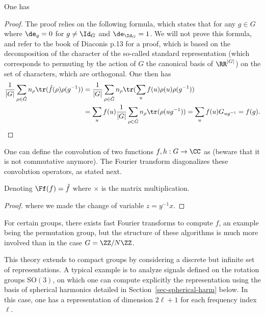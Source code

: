 \begin{prop}
One has
\end{prop}
\begin{proof}
The proof relies on the following formula, which states that for any $g \in G$
where $\de_g=0$ for $g \neq \Id_G$ and $\de_{\Id_G}=1$. We will not prove this formula, and refer to the book of Diaconis p.13 for a proof, which is based on the decomposition of the character of the so-called standard representation (which corresponds to permuting by the action of $G$ the canonical basis of $\RR^{|G|}$) on the set of characters, which are orthogonal. 
%
One then has 
\begin{align*}
	\frac{1}{|G|} \sum_{\rho \in \hat G} n_\rho \tr( \hat f(\rho) \rho(g^{-1}) ) 
	&=  \frac{1}{|G|} \sum_{\rho \in \hat G} n_\rho \tr( \sum_u f(u) \rho(u) \rho(g^{-1}) ) \\
	&=  \sum_u  f(u) \frac{1}{|G|}  \sum_{\rho \in \hat G} n_\rho \tr( \rho(u g^{-1}) )
	=  \sum_u  f(u) G_{ug^{-1}} = f(g).
\end{align*}
\end{proof}

One can define the convolution of two functions $f,h : G \rightarrow \CC$ as
(beware that it is not commutative anymore). The Fourier transform diagonalizes these convolution operators, as stated next.

\begin{prop}
Denoting $\Ff(f) = \hat f$
where $\times$ is the matrix multiplication.
\end{prop}
\begin{proof}
where we made the change of variable $z=y^{-1}x$.
\end{proof}


For certain groups, there exists fast Fourier transforms to compute $\hat f$, an example being the permutation group, but the structure of these algorithms is much more involved than in the case $G=\ZZ/N\ZZ$. 

This theory extends to compact groups by considering a discrete but infinite set of representations. A typical example is to analyze signals defined on the rotation groups SO$(3)$, on which one can compute explicitly the representation using the basis of spherical harmonics detailed in Section~\ref{sec-spherical-harm} below. In this case, one has a representation of dimension $2\ell+1$ for each frequency index $\ell$. 
 
